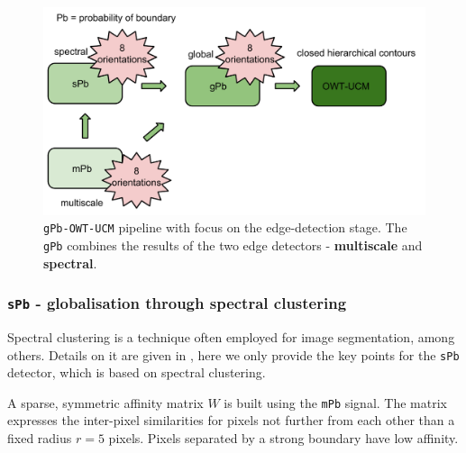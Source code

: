 \begin{figure}[t]
\centering
\includegraphics[width=1\textwidth]{images/gPb-OWT-UCM/gPb-algorithm-details-mPb_sPb_gPb.pdf}
\caption[{\tt gPb-OWT-UCM} pipeline with focus on the edge-detection stage - {\tt gPb}]{{\tt gPb-OWT-UCM} pipeline with focus on the edge-detection stage. The {\tt gPb} combines the results of the two edge detectors - {\bf multiscale} and {\bf spectral}.}
\label{fig:gPb-algorithm-details-mPb_sPb_gPb}
\end{figure}

\subsubsection{{\tt sPb} - globalisation through spectral clustering}
\label{sec:ch3-sPb}

Spectral clustering is a technique often employed for image segmentation, among others. Details on it are given in \cite{Leung1998contour,Shi2000normalized,Fowlkes2003learning,Fowlkes04}, here we only provide the key %
points for the %
{\tt sPb} detector, which is based on %
spectral clustering. 

A sparse, symmetric affinity matrix $W$ is built using the {\tt mPb} signal. The matrix expresses the inter-pixel similarities for pixels not further from each other than a fixed radius $r=5$ pixels. Pixels separated by a strong boundary have low affinity.


